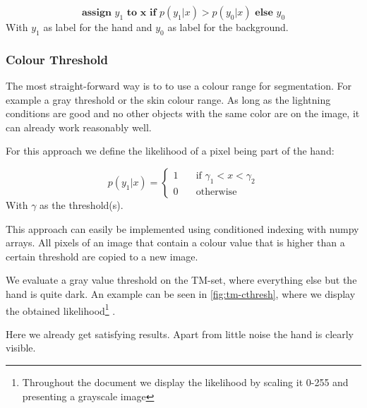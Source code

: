 \documentclass[letterpaper, 10 pt, conference]{ieeeconf}  %
\begin{document}
\begin{equation}
	\textbf{assign } y_1 \textbf{ to x if } p(y_1|x) > p(y_0|x) \textbf{ else } y_0
\end{equation}
With $y_1$ as label for the hand and $y_0$ as label for the background. 

\subsubsection{Colour Threshold}

The most straight-forward way is to to use a colour range for segmentation. For example a gray threshold or the skin colour range. As long as the lightning conditions are good and no other objects with the same color are on the image, it can already work reasonably well. 

For this approach we define the likelihood of a pixel being part of the hand:

\begin{equation}
p(y_1 | x) = \begin{cases}
1 & \quad \text{if } \gamma_1 < x < \gamma_2 \\
0 & \quad \text{otherwise}
\end{cases}
\end{equation}
With $\gamma$ as the threshold(s).

This approach can easily be implemented using conditioned indexing with numpy arrays. All pixels of an image that contain a colour value that is higher than a certain threshold are copied to a new image.

We evaluate a gray value threshold on the TM-set, where everything else but the hand is quite dark. An example can be seen in \autoref{fig:tm-cthresh}, where we display the obtained likelihood\footnote{Throughout the document we display the likelihood by scaling it 0-255 and presenting a grayscale image} . 

Here we already get satisfying results. Apart from little noise the hand is clearly visible. 
\end{document}
